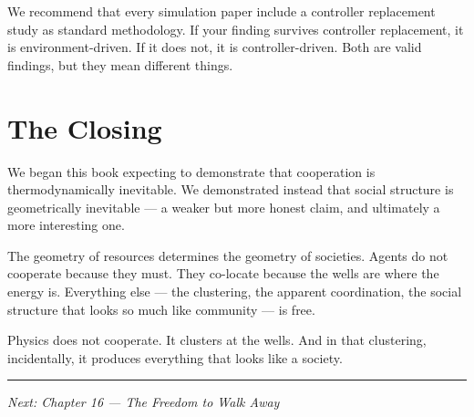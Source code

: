 We recommend that every simulation paper include a controller replacement study as standard methodology. If your finding survives controller replacement, it is environment-driven. If it does not, it is controller-driven. Both are valid findings, but they mean different things.

\section{The Closing}\label{the-closing}

We began this book expecting to demonstrate that cooperation is thermodynamically inevitable. We demonstrated instead that social structure is geometrically inevitable --- a weaker but more honest claim, and ultimately a more interesting one.

The geometry of resources determines the geometry of societies. Agents do not cooperate because they must. They co-locate because the wells are where the energy is. Everything else --- the clustering, the apparent coordination, the social structure that looks so much like community --- is free.

Physics does not cooperate. It clusters at the wells. And in that clustering, incidentally, it produces everything that looks like a society.

\begin{center}\rule{0.5\linewidth}{0.5pt}\end{center}

\emph{Next: Chapter 16 --- The Freedom to Walk Away}
